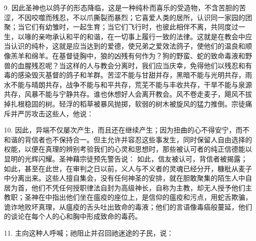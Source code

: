 9. 因此圣神也以鸽子的形态降临，这是一种纯朴而喜乐的受造物，不含苦胆的苦涩，不因咬噬而残忍，不以爪撕裂而暴烈；它喜爱人类的居所，认识同一家园的团聚；当它们有幼雏时，一起生育；当它们飞行时，也彼此相伴不离，共同度过一生，以喙的亲吻承认和平的和谐，在一切事上履行一致的法律。这就是在教会中应当认识的纯朴，这就是应当达到的爱德，使兄弟之爱效法鸽子，使他们的温良和顺像羔羊和绵羊。在基督徒胸中，狼的凶残有何作为？狗的野蛮、蛇的致命毒液和野兽的血腥残忍呢？当这样的人与教会分离时，我们应当庆幸，免得他们以残忍和有毒的感染毁灭基督的鸽子和羊群。苦涩不能与甘甜并存，黑暗不能与光明共存，雨水不能与晴朗共存，战争不能与和平共存，荒芜不能与丰收共存，干旱不能与泉源共存，风暴不能与宁静共存。谁也休想好人会离开教会。风不卷走麦子，飓风不拔掉扎根稳固的树。轻浮的稻草被暴风抛掷，软弱的树木被旋风的猛力推倒。宗徒痛斥并严厉攻击这些人，他说：\par

10. 因此，异端不仅屡次产生，而且还在继续产生；因为扭曲的心不得安宁，而不和谐的背信者也不保持合一。但主允许并容忍这些事发生，同时保留人自由选择的权能，以便在真理的辨别考验我们的心灵和思想时，那些被认可者的纯正信德能以显明的光辉闪耀。圣神藉宗徒预先警告说： 如此，信友被认可，背信者被揭露；如此，甚至在此世，在审判之日以前，义人与不义者的灵魂已经分开，糠秕从麦子中分离出来。这些人擅自集会，没有任何神圣的安排，就在胆敢聚集的陌生人中自居为首，他们不凭任何授职律法自封为高级神长，自称为主教，却无人授予他们主教职；圣神在中指出他们坐在瘟疫的座位上，是信仰的瘟疫和污点，用蛇舌欺骗，诡诈地败坏真理，从瘟疫的舌头吐出致命的毒液；他们的言语像毒癌般蔓延，他们的谈论在每个人的心和胸中形成致命的毒药。\par

11. 主向这种人呼喊；祂阻止并召回祂迷途的子民，说：\par


